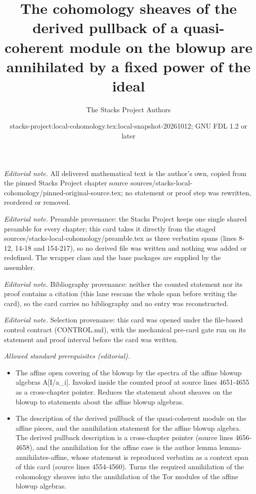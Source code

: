 \documentclass[10pt,a4paper]{amsart}
\title{The cohomology sheaves of the derived pullback of a quasi-coherent module on the blowup are annihilated by a fixed power of the ideal}
\author{The Stacks Project Authors}
\date{stacks-project:local-cohomology.tex:local-snapshot-20261012; GNU FDL 1.2 or later}
\theoremstyle{plain}
\theoremstyle{definition}
\theoremstyle{remark}
\numberwithin{equation}{subsection}
\begin{document}
\maketitle
\noindent\textit{Editorial note.} All delivered mathematical text is the author's own, copied from the pinned Stacks Project chapter source sources/stacks-local-cohomology/pinned-original-source.tex; no statement or proof step was rewritten, reordered or removed.\par\medskip
\noindent\textit{Editorial note.} Preamble provenance: the Stacks Project keeps one single shared preamble for every chapter; this card takes it directly from the staged sources/stacks-local-cohomology/preamble.tex as three verbatim spans (lines 8-12, 14-18 and 154-217), so no derived file was written and nothing was added or redefined. The wrapper class and the base packages are supplied by the assembler.\par\medskip
\noindent\textit{Editorial note.} Bibliography provenance: neither the counted statement nor its proof contains a citation (this lane rescans the whole span before writing the card), so the card carries no bibliography and no entry was reconstructed.\par\medskip
\noindent\textit{Editorial note.} Selection provenance: this card was opened under the file-based control contract (CONTROL.md), with the mechanical pre-card gate run on its statement and proof interval before the card was written.\par\medskip
\noindent\textit{Allowed standard prerequisites (editorial).}\begin{itemize}
\item The affine open covering of the blowup by the spectra of the affine blowup algebras A[I/a\_i]. Invoked inside the counted proof at source lines 4651-4655 as a cross-chapter pointer. Reduces the statement about sheaves on the blowup to statements about the affine blowup algebras.
\item The description of the derived pullback of the quasi-coherent module on the affine pieces, and the annihilation statement for the affine blowup algebra. The derived pullback description is a cross-chapter pointer (source lines 4656-4658), and the annihilation for the affine case is the author lemma lemma-annihilates-affine, whose statement is reproduced verbatim as a context span of this card (source lines 4554-4560). Turns the required annihilation of the cohomology sheaves into the annihilation of the Tor modules of the affine blowup algebras.
\end{itemize}\medskip
\end{document}
